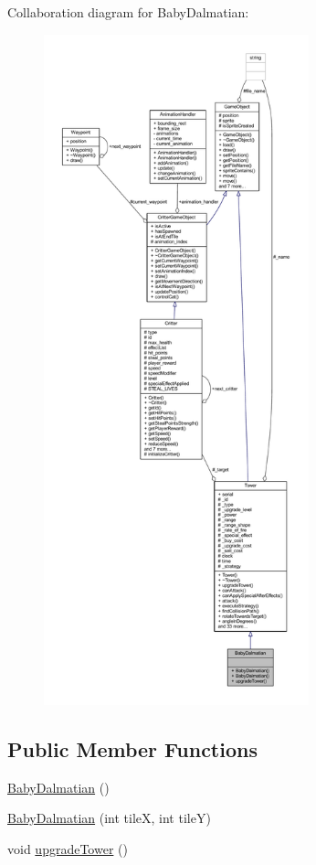 Collaboration diagram for Baby\+Dalmatian\+:
\nopagebreak
\begin{figure}[H]
\begin{center}
\leavevmode
\includegraphics[height=550pt]{class_baby_dalmatian__coll__graph}
\end{center}
\end{figure}
\subsection*{Public Member Functions}
\begin{DoxyCompactItemize}
\item 
\hyperlink{class_baby_dalmatian_a8f4acd61c863f01d1d525723349c9e89}{Baby\+Dalmatian} ()
\item 
\hyperlink{class_baby_dalmatian_a0b9460fd26d39fa361b1386486f96f19}{Baby\+Dalmatian} (int tile\+X, int tile\+Y)
\item 
void \hyperlink{class_baby_dalmatian_abec6768cc0316e08889e5c1fa67a6468}{upgrade\+Tower} ()
\end{DoxyCompactItemize}
